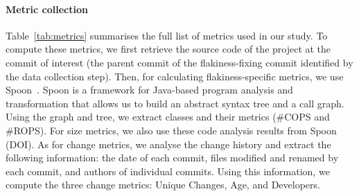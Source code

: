 \paragraph{Metric collection}
Table~\ref{tab:metrics} summarises the full list of metrics used in our study.
To compute these metrics, we first retrieve the source code of the project at the commit of interest (\ie the parent commit of the flakiness-fixing commit identified by the data collection step).
Then, for calculating flakiness-specific metrics, we use Spoon~\cite{spoon}.
Spoon is a framework for Java-based program analysis and transformation that allows us to build an abstract syntax tree and a call graph.
Using the graph and tree, we extract classes and their metrics (\eg \#COPS and \#ROPS). 
For size metrics, we also use these code analysis results from Spoon (\eg DOI). 
As for change metrics, we analyse the change history and extract the following information: the date of each commit, files modified and renamed by each commit, and authors of individual commits. Using this information, we compute the three change metrics: Unique Changes, Age, and Developers.

